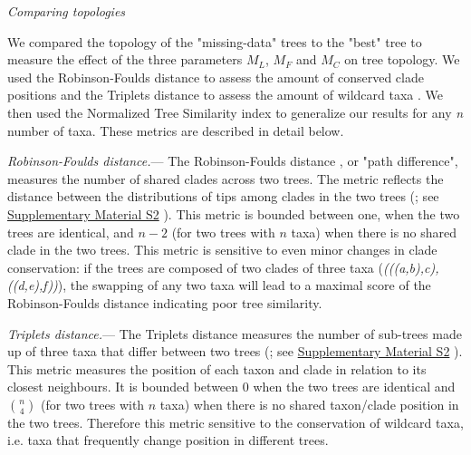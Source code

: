 \documentclass[12pt,letterpaper]{article}
\renewcommand{\subsection}[1]{%
\bigskip
\begin{center}
\begin{large}
\normalfont\itshape #1
\end{large}
\end{center}}
\renewcommand{\subsubsection}[1]{%
\vspace{2ex}
\noindent
\textit{#1.}---}
\begin{document}

\subsection{Comparing topologies}
We compared the topology of the "missing-data" trees to the "best" tree to measure the effect of the three parameters $M_{L}$, $M_{F}$ and $M_{C}$ on tree topology. We used the Robinson-Foulds distance \citep{RF1981} to assess the amount of conserved clade positions and the Triplets distance \citep{dobson1975triplets} to assess the amount of wildcard taxa \citep{kearneyfragmentary2002}. We then used the Normalized Tree Similarity index \citep{Bogdanowicz2012} to generalize our results for any \textit{n} number of taxa. These metrics are described in detail below.

\subsubsection{Robinson-Foulds distance}
The Robinson-Foulds distance \citep{RF1981}, or "path difference", measures the number of shared clades across two trees. The metric reflects the distance between the distributions of tips among clades in the two trees (\citealt{RF1981}; see \hyperref[SupplementaryMaterial]{Supplementary Material S2}
). This metric is bounded between one, when the two trees are identical, and $n-2$ (for two trees with $n$ taxa) when there is no shared clade in the two trees. This metric is sensitive to even minor changes in clade conservation: if the trees are composed of two clades of three taxa (\textit{(((a,b),c),((d,e),f))}), the swapping of any two taxa will lead to a maximal score of the Robinson-Foulds distance indicating poor tree similarity.

\subsubsection{Triplets distance}
The Triplets distance \citep{dobson1975triplets} measures the number of sub-trees made up of three taxa that differ between two trees (\citealt{critchlowthe1996}; see \hyperref[SupplementaryMaterial]{Supplementary Material S2}
). This metric measures the position of each taxon and clade in relation to its closest neighbours. It is bounded between 0 when the two trees are identical and $\binom{n}{4}$ (for two trees with $n$ taxa) when there is no shared taxon/clade position in the two trees. Therefore this metric sensitive to the conservation of wildcard taxa, i.e. taxa that frequently change position in different trees.
\end{document}
